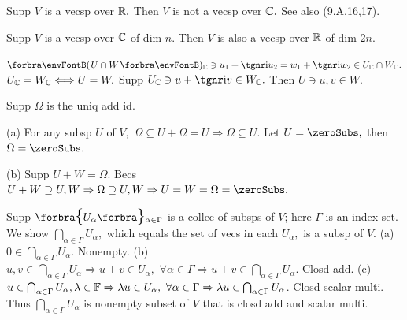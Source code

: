 \BulletPointX{}\;\;Supp $V$ is a vecsp over ${\mathbb{R}}.$ Then $V$ is not a vecsp over ${\mathbb{C}}.$ See also (9.A.16,17).\par
\BulletPointX\AComm Supp $V$ is a vecsp over ${\mathbb{C}}$ of dim $n.$ Then $V$ is also a vecsp over ${\mathbb{R}}$ of dim $2n.$\vspace{-4pt}
\SepLine

\SepLine

\BulletPointX{}\par
{} \qquad {}\PfEnd
{}\PfEnd{}
\PfEnd
\BulletPointX{ \quad}$\Par{U\cap W}{_\Cbb}\ni u_1+\i u_2=w_1+\i w_2\in U_\Cbb\cap W_\Cbb.$\PfEnd
\BulletPointX{ \quad}$U_{\mathbb{C}}=W_{\mathbb{C}}\Longleftrightarrow U=W.$ \;Supp $U_\Cbb\ni u+\i v\in W_\Cbb.$ Then $U\ni u,v\in W.$\PfEnd
\SepLine


Supp $\Omega$ is the uniq add id.\par\quad
(a) For any subsp $U$ of $V,$ $\Omega\subseteq U+\Omega=U\Rightarrow\Omega\subseteq U$. Let $U=\zeroSubs,$ then $\Omega=\zeroSubs.$\par\quad
(b) Supp $U+W=\Omega.$ Becs $U+W\supseteq U,W\Rightarrow \Omega\supseteq U,W\Rightarrow U=W=\Omega=\zeroSubs.$\PfEnd
\SepLine

Supp $\Bra{U_{\alpha}}{_{\alpha\in\Gamma}}$ is a collec of subsps of $V$; here $\Gamma$ is an index set.\vspace{2pt}\parSol{}
We show $\bigcap_{\alpha\in\Gamma}U_\alpha,$ which equals the set of vecs in each $U_\alpha,$ is a subsp of $V$.\vspace{2pt}\parSol{}
(a) $0\in\bigcap_{\alpha\in\Gamma}U_\alpha.$ Nonempty.\parSol{}
(b) $u,v\in\bigcap_{\alpha\in\Gamma}U_\alpha\Rightarrow u+v\in U_\alpha,\,\,\forall\alpha\in\Gamma\Rightarrow u+v\in\bigcap_{\alpha\in\Gamma}U_\alpha$. Closd add.\parSol{}
(c) $u\in\bigcap_{\alpha\in\Gamma}U_\alpha,\lambda\in{\mathbb{F}}\Rightarrow\lambda u\in U_\alpha,\,\,\forall\alpha\in\Gamma\Rightarrow\lambda u\in\bigcap_{\alpha\in\Gamma}U_\alpha$. Closd scalar multi.\vspace{4pt}\parSol{}
Thus $\bigcap_{\alpha\in\Gamma}U_\alpha$ is nonempty subset of $V$ that is closd add and scalar multi.\PfEnd
\SepLine

